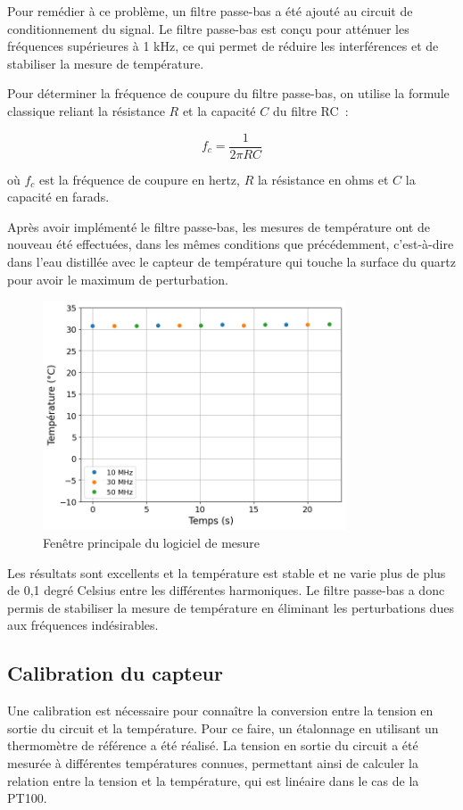 Pour remédier à ce problème, un filtre passe-bas a été ajouté au circuit de conditionnement du signal.
Le filtre passe-bas est conçu pour atténuer les fréquences supérieures à 1 kHz, ce qui permet de réduire les interférences et de stabiliser la mesure de température.

Pour déterminer la fréquence de coupure du filtre passe-bas, on utilise la formule classique reliant la résistance $R$ et la capacité $C$ du filtre RC :

\begin{equation}
f_c = \frac{1}{2\pi RC}
\label{eq:frequence_coupure}
\end{equation}

où $f_c$ est la fréquence de coupure en hertz, $R$ la résistance en ohms et $C$ la capacité en farads.

Après avoir implémenté le filtre passe-bas, les mesures de température ont de nouveau été effectuées, dans les mêmes conditions que précédemment, c'est-à-dire dans l'eau distillée avec le capteur de température qui touche la surface du quartz pour avoir le maximum de perturbation.

\begin{figure}[H]
    \centering
    \includegraphics[width=0.8\textwidth]{assets/figures/TempFiltered.png}
    \caption{Fenêtre principale du logiciel de mesure}
    \label{fig:TempBruitFiltre}
\end{figure}

Les résultats sont excellents et la température est stable et ne varie plus de plus de 0,1 degré Celsius entre les différentes harmoniques.
Le filtre passe-bas a donc permis de stabiliser la mesure de température en éliminant les perturbations dues aux fréquences indésirables.

\subsection{Calibration du capteur}
Une calibration est nécessaire pour connaître la conversion entre la tension en sortie du circuit et la température.
Pour ce faire, un étalonnage en utilisant un thermomètre de référence a été réalisé. La tension en sortie du circuit a été mesurée à différentes températures connues, permettant ainsi de calculer la relation entre la tension et la température, qui est linéaire dans le cas de la PT100.


